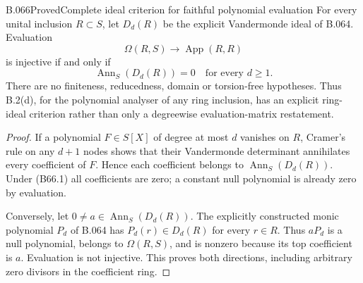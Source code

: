 \begin{saresult}{B.066}{Proved}{Complete ideal criterion for faithful polynomial evaluation}
For every unital inclusion $R\subset S$, let $D_d(R)$
be the explicit Vandermonde ideal of B.064. Evaluation
\[
 \Omega(R,S)\longrightarrow\operatorname{App}(R,R)
\]
is injective if and only if
\[
                  \operatorname{Ann}_S(D_d(R))=0
                  \quad\text{for every }d\ge1.           \tag{B66.1}
\]
There are no finiteness, reducedness, domain or
torsion-free hypotheses. Thus B.2(d), for the
polynomial analyser of any ring inclusion, has an
explicit ring-ideal criterion rather than only a
degreewise evaluation-matrix restatement.
\end{saresult}
\begin{proof}
If a polynomial $F\in S[X]$ of degree at most $d$
vanishes on $R$, Cramer's rule on any $d+1$ nodes
shows that their Vandermonde determinant annihilates
every coefficient of $F$. Hence each coefficient
belongs to $\operatorname{Ann}_S(D_d(R))$.
Under (B66.1) all coefficients are zero; a constant
null polynomial is already zero by evaluation.

Conversely, let $0\ne a\in\operatorname{Ann}_S(D_d(R))$.
The explicitly constructed monic polynomial $P_d$
of B.064 has $P_d(r)\in D_d(R)$ for every $r\in R$.
Thus $aP_d$ is a null polynomial, belongs to
$\Omega(R,S)$, and is nonzero because its top
coefficient is $a$. Evaluation is not injective.
This proves both directions, including arbitrary
zero divisors in the coefficient ring.
\end{proof}
